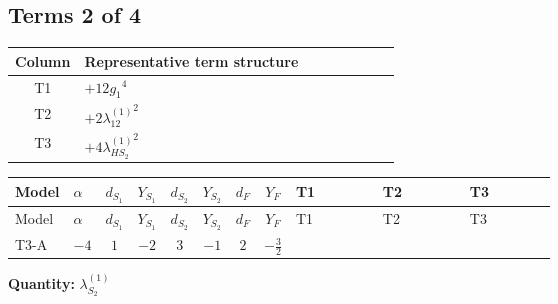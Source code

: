 \documentclass[8pt]{article}
\begin{document}
\begin{landscape}
\subsection*{Terms 2 of 4}
\begin{center}
\begin{tabular}{@{}c >{\raggedright\arraybackslash}p{0.82\linewidth}@{}}
\toprule
Column & Representative term structure \\
\midrule
T1 & \(\displaystyle +12 {g_1}^4\) \\
\midrule
T2 & \(\displaystyle +2 {\lambda_{12}^{(1)}}^2\) \\
\midrule
T3 & \(\displaystyle +4 {\lambda_{HS_2}^{(1)}}^2\) \\
\midrule
\bottomrule
\end{tabular}
\end{center}
\smallskip
\tiny
\begin{longtable}{@{}llcccccc >{\raggedright\arraybackslash}p{0.21\linewidth} >{\raggedright\arraybackslash}p{0.21\linewidth} >{\raggedright\arraybackslash}p{0.21\linewidth}@{}}
\toprule
Model & $\alpha$ & $d_{S_1}$ & $Y_{S_1}$ & $d_{S_2}$ & $Y_{S_2}$ & $d_F$ & $Y_F$ & T1 & T2 & T3 \\
\midrule
\endfirsthead
\toprule
Model & $\alpha$ & $d_{S_1}$ & $Y_{S_1}$ & $d_{S_2}$ & $Y_{S_2}$ & $d_F$ & $Y_F$ & T1 & T2 & T3 \\
\midrule
\endhead
T3-A & $-4$ & $1$ & $-2$ & $3$ & $-1$ & $2$ & $-\frac{3}{2}$ & \scriptsize\adjustbox{max width=\linewidth}{$\begin{gathered} +12 {g_1}^4\end{gathered}$} & \scriptsize\adjustbox{max width=\linewidth}{$\begin{gathered} +2 {\lambda_{12}^{(1)}}^2\end{gathered}$} & \scriptsize\adjustbox{max width=\linewidth}{$\begin{gathered} +4 {\lambda_{HS_2}^{(1)}}^2\end{gathered}$} \\
\midrule
\bottomrule
\end{longtable}
\clearpage
\noindent\textbf{Quantity: }$\lambda_{S_2}^{(1)}$\par\smallskip

\end{landscape}
\end{document}
